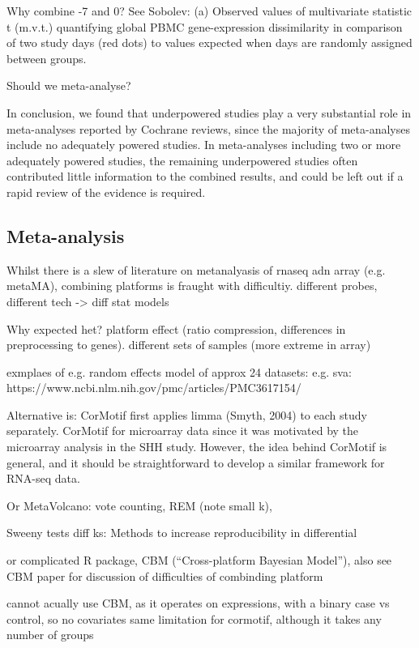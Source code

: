 Why combine -7 and 0? See Sobolev:
(a) Observed values of multivariate statistic t (m.v.t.) quantifying global PBMC gene-expression dissimilarity in comparison of two study days (red dots) to values expected when days are randomly assigned between groups.

Should we meta-analyse?

In conclusion, we found that underpowered studies play a very substantial role in meta-analyses reported by Cochrane reviews, since the majority of meta-analyses include no adequately powered studies. In meta-analyses including two or more adequately powered studies, the remaining underpowered studies often contributed little information to the combined results, and could be left out if a rapid review of the evidence is required.

\subsection{Meta-analysis}

Whilst there is a slew of literature on metanalyasis of rnaseq adn array (e.g. metaMA), combining platforms is fraught with difficultiy.
different probes, 
different tech -> diff stat models

Why expected het?
platform effect (ratio compression, differences in preprocessing to genes). different sets of samples (more extreme in array)

exmplaes of 
e.g. random effects model of approx 24 datasets: 
e.g. sva: https://www.ncbi.nlm.nih.gov/pmc/articles/PMC3617154/


Alternative is: CorMotif first applies limma (Smyth, 2004) to each study separately.
CorMotif for microarray data since it was motivated by the microarray analysis in the SHH study. However, the idea behind CorMotif is general, and it should be straightforward to develop a similar framework for RNA-seq data.

Or MetaVolcano: vote counting, REM (note small k), 

Sweeny tests diff ks: Methods to increase reproducibility in differential

or complicated R package, CBM (“Cross-platform Bayesian Model”),
also see CBM paper for discussion of difficulties of combinding platform

cannot acually use CBM, as it operates on expressions, with a binary case vs control, so no covariates
same limitation for cormotif, although it takes any number of groups

